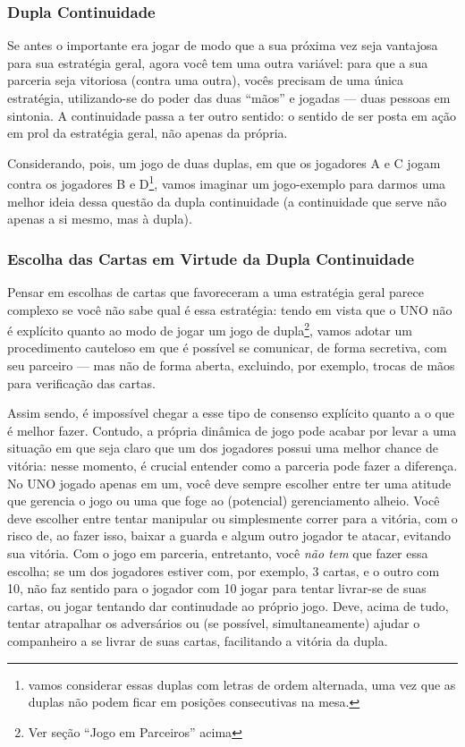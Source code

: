 \subsubsection{Dupla Continuidade}

Se antes o importante era jogar de modo que a sua próxima vez seja vantajosa para sua estratégia geral, agora você tem uma outra variável: para que a sua parceria seja vitoriosa (contra uma outra), vocês precisam de uma única estratégia, utilizando-se do poder das duas ``mãos'' e jogadas --- duas pessoas em sintonia. A continuidade passa a ter outro sentido: o sentido de ser posta em ação em prol da estratégia geral, não apenas da própria.

Considerando, pois, um jogo de duas duplas, em que os jogadores A e C jogam contra os jogadores B e D\footnote{vamos considerar essas duplas com letras de ordem alternada, uma vez que as duplas não podem ficar em posições consecutivas na mesa.}, vamos imaginar um jogo-exemplo para darmos uma melhor ideia dessa questão da dupla continuidade (a continuidade que serve não apenas a si mesmo, mas à dupla).

\subsubsection{Escolha das Cartas em Virtude da Dupla Continuidade}

Pensar em escolhas de cartas que favoreceram a uma estratégia geral parece complexo se você não sabe qual é essa estratégia: tendo em vista que o UNO não é explícito quanto ao modo de jogar um jogo de dupla\footnote{Ver seção ``Jogo em Parceiros'' acima}, vamos adotar um procedimento cauteloso em que é possível se comunicar, de forma secretiva, com seu parceiro --- mas não de forma aberta, excluindo, por exemplo, trocas de mãos para verificação das cartas.

Assim sendo, é impossível chegar a esse tipo de consenso explícito quanto a o que é melhor fazer. Contudo, a própria dinâmica de jogo pode acabar por levar a uma situação em que seja claro que um dos jogadores possui uma melhor chance de vitória: nesse momento, é crucial entender como a parceria pode fazer a diferença. No UNO jogado apenas em um, você deve sempre escolher entre ter uma atitude que gerencia o jogo ou uma que foge ao (potencial) gerenciamento alheio. Você deve escolher entre tentar manipular ou simplesmente correr para a vitória, com o risco de, ao fazer isso, baixar a guarda e algum outro jogador te atacar, evitando sua vitória. Com o jogo em parceria, entretanto, você \emph{não tem} que fazer essa escolha; se um dos jogadores estiver com, por exemplo, 3 cartas, e o outro com 10, não faz sentido para o jogador com 10 jogar para tentar livrar-se de suas cartas, ou jogar tentando dar continudade ao próprio jogo. Deve, acima de tudo, tentar atrapalhar os adversários ou (se possível, simultaneamente) ajudar o companheiro a se livrar de suas cartas, facilitando a vitória da dupla.

